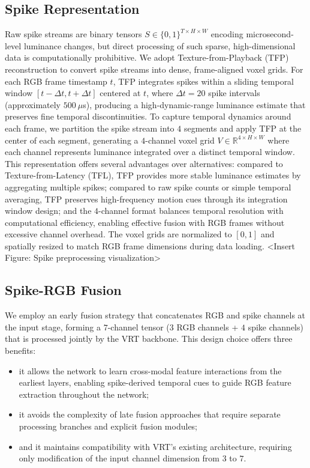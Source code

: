 \documentclass[conference]{IEEEtran}
\begin{document}
\subsection{Spike Representation}
Raw spike streams are binary tensors $S \in \{0,1\}^{T \times H \times W}$ encoding microsecond-level luminance changes, but direct processing of such sparse, high-dimensional data is computationally prohibitive. We adopt Texture-from-Playback (TFP) reconstruction \cite{dong_spike_2021} to convert spike streams into dense, frame-aligned voxel grids. For each RGB frame timestamp $t$, TFP integrates spikes within a sliding temporal window $[t-\Delta t, t+\Delta t]$ centered at $t$, where $\Delta t = 20$ spike intervals (approximately $500~\mu$s), producing a high-dynamic-range luminance estimate that preserves fine temporal discontinuities. To capture temporal dynamics around each frame, we partition the spike stream into $4$ segments and apply TFP at the center of each segment, generating a $4$-channel voxel grid $V \in \mathbb{R}^{4 \times H \times W}$ where each channel represents luminance integrated over a distinct temporal window. This representation offers several advantages over alternatives: compared to Texture-from-Latency (TFL), TFP provides more stable luminance estimates by aggregating multiple spikes; compared to raw spike counts or simple temporal averaging, TFP preserves high-frequency motion cues through its integration window design; and the $4$-channel format balances temporal resolution with computational efficiency, enabling effective fusion with RGB frames without excessive channel overhead. The voxel grids are normalized to $[0,1]$ and spatially resized to match RGB frame dimensions during data loading.
<Insert Figure: Spike preprocessing visualization>

\subsection{Spike-RGB Fusion}
We employ an early fusion strategy that concatenates RGB and spike channels at the input stage, forming a $7$-channel tensor ($3$ RGB channels + $4$ spike channels) that is processed jointly by the VRT backbone. This design choice offers three benefits: 

\begin{itemize}
\item  it allows the network to learn cross-modal feature interactions from the earliest layers, enabling spike-derived temporal cues to guide RGB feature extraction throughout the network; 
\item  it avoids the complexity of late fusion approaches that require separate processing branches and explicit fusion modules; 
\item and it maintains compatibility with VRT's existing architecture, requiring only modification of the input channel dimension from $3$ to $7$. 
\end{itemize}
\end{document}
